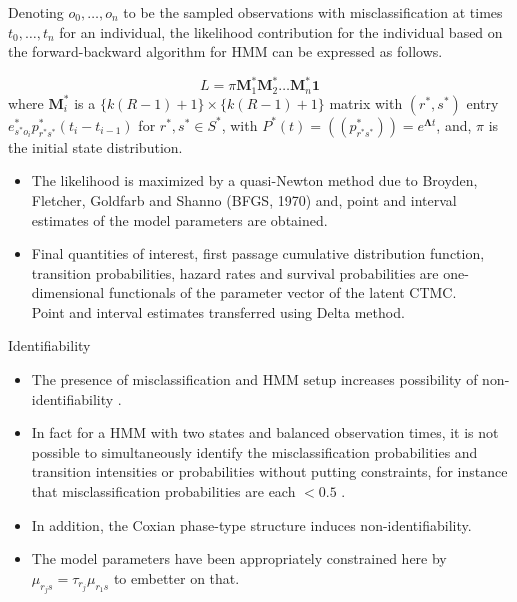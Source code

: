 \documentclass{beamer}
\begin{document}
\begin{frame}
Denoting $o_0,\ldots, o_{n}$ to be the sampled observations with misclassification at times $t_0,\ldots,t_{n}$ for an individual, the likelihood contribution for the individual based on the forward-backward algorithm for HMM can be expressed as follows.

\[
L=\pi \bm{M}_1^* \bm{M}_2^* \ldots \bm{M}_{n}^* \bm{1}
\]
where $\bm{M}_i^*$ is a $\{k(R-1) +1\} \times \{k(R-1) +1\}$ matrix with $(r^*,s^*)$ entry $e^*_{s^* o_i} p^*_{r^* s^*} (t_i - t_{i-1})$ for $r^*, s^* \in S^*$, with $P^*(t)=((p^*_{r^* s^*})) = e^{\bm{\Lambda}t}$,  and, $\pi$ is the initial state distribution.

\end{frame}
\begin{frame}
\begin{itemize}
\item The likelihood is maximized by a quasi-Newton method due to Broyden, Fletcher, Goldfarb and Shanno (BFGS, 1970) and, point and interval estimates of the model parameters are obtained.

\item Final quantities of interest, first passage cumulative distribution function, transition probabilities, hazard rates and survival probabilities are one-dimensional functionals of the parameter vector of the latent CTMC. \vspace{0.8mm} \\Point and interval estimates transferred using Delta method.
\end{itemize}
\end{frame}

\begin{frame}{Identifiability}
\begin{itemize}
\item The presence of misclassification and HMM setup increases possibility of non-identifiability \citep{macdonald1997hidden}.
\item In fact for a HMM with two states and balanced observation times, it is not possible to simultaneously identify the misclassification probabilities and transition intensities or probabilities without putting constraints, for instance that misclassification probabilities are each $<0.5$ \citep{rosychuk2003bias}.
\item In addition, the Coxian phase-type structure induces non-identifiability.
\item The model parameters have been appropriately constrained here by $\mu_{r_j s}=\tau_{r_j } \mu_{r_1 s}$ to embetter on that. 
\end{itemize}
\end{frame}
\end{document}

